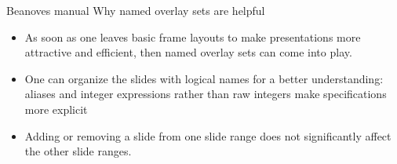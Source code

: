 \documentclass{beamer}
\begin{document}
\begin{frame}
{Beanoves manual}
{\large Why named overlay sets are helpful}
\begin{itemize}
\item
As soon as one leaves basic frame layouts to make presentations more attractive and efficient, then  named overlay sets can come into play.
\item
One can organize the slides with logical names for a better understanding: aliases and integer expressions rather than raw integers make specifications more explicit
\item
Adding or removing a slide from one slide range does not significantly affect the other slide ranges.
\end{itemize}
\end{frame}
\end{document}
